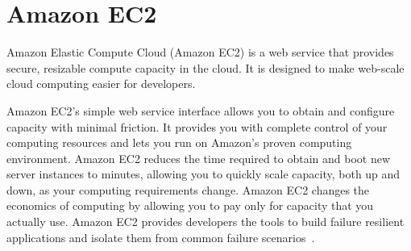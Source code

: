 \section{Amazon EC2}
Amazon Elastic Compute Cloud (Amazon EC2) is a web service that
provides secure, resizable compute capacity in the cloud. It is
designed to make web-scale cloud computing easier for developers.

Amazon EC2’s simple web service interface allows you to obtain and
configure capacity with minimal friction. It provides you with
complete control of your computing resources and lets you run on
Amazon’s proven computing environment.  Amazon EC2 reduces the time
required to obtain and boot new server instances to minutes, allowing
you to quickly scale capacity, both up and down, as your computing
requirements change. Amazon EC2 changes the economics of computing by
allowing you to pay only for capacity that you actually use. Amazon
EC2 provides developers the tools to build failure resilient
applications and isolate them from common failure
scenarios~\cite{www-amazonec2}.
